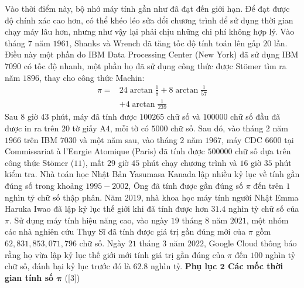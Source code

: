 \begin{multicols}{2}
	\vskip 0.1cm
	Vào thời điểm này, bộ nhớ máy tính gần như đã đạt đến giới hạn. Để đạt được độ chính xác cao hơn, có thể khéo léo sửa đổi chương trình để sử dụng thời gian chạy máy lâu hơn, nhưng như vậy lại phải chịu những chi phí không hợp lý.
	\vskip 0.1cm
	Vào tháng $7$ năm $1961$, Shanks và Wrench đã tăng tốc độ tính toán lên gấp $20$ lần. Điều này một phần do IBM Data Processing Center (New York) đã sử dụng IBM $7090$ có tốc độ nhanh, một phần họ đã sử dụng công thức được Stömer tìm ra năm $1896$, thay cho công thức Machin:
	\begin{align*}
		\pi  =& 24\arctan \frac{1}{8} + 8\arctan \frac{1}{{57}} \\
		&+ 4\arctan \frac{1}{{239}} \tag{$11$}
	\end{align*}
	Sau $8$ giờ $43$ phút, máy đã tính được $100265$ chữ số và $100000$ chữ số đầu đã được in ra trên $20$ tờ giấy A$4$, mỗi tờ có $5000$ chữ số.
	\vskip 0.1cm
	Sau đó, vào tháng $2$ năm $1966$ trên IBM $7030$ và một năm sau, vào tháng $2$ năm $1967$, máy CDC $6600$ tại Commissariat à l'Enrgie Atomique (Paris) đã tính được $500000$ chữ số dựa trên công thức Stömer ($11$), mất $29$ giờ $45$ phút chạy chương trình và $16$ giờ $35$ phút kiểm tra. 
	\vskip 0.1cm
	Nhà toán học Nhật Bản Yasumasa Kanada lập nhiều kỷ lục về tính gần đúng số   trong khoảng $1995-2002$, Ông đã tính được gần đúng số  $\pi$ đến trên $1$ nghìn tỷ chữ số thập phân.
	\vskip 0.1cm
	Năm $2019$, nhà khoa học máy tính người Nhật Emma Haruka Iwao đã lập kỷ lục thế giới khi đã tính được hơn $31.4$ nghìn tỷ chữ số của $\pi$.
	\vskip 0.1cm 
	Sử dụng máy tính hiệu năng cao, vào ngày $19$ tháng $8$ năm $2021$, một nhóm các nhà nghiên cứu Thụy Sĩ đã tính được giá trị gần đúng mới của $\pi$  gồm $62,831,853,071,796$ chữ số.
	\vskip 0.1cm
	Ngày $21$ tháng $3$ năm $2022$, Google Cloud thông báo rằng họ vừa lập kỷ lục thế giới mới tính giá trị gần đúng của $\pi$  đến $100$ nghìn tỷ chữ số, đánh bại kỷ lục trước đó là $62.8$ nghìn tỷ.
	\vskip 0.1cm
	\textbf{\color{lichsutoanhoc}Phụ lục $\pmb2$ Các mốc thời gian tính số $\pmb{\pi}$ }([$3$])
	\begin{figure}[H]
		\vspace*{-5pt}
		\centering
		\captionsetup{labelformat= empty, justification=centering}

\end{figure}
\end{multicols}
